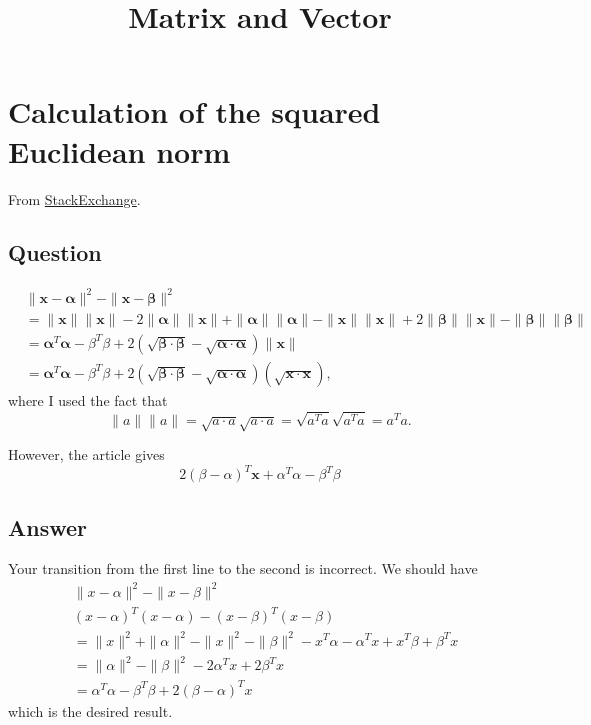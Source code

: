 \documentclass[a4paper,10.5pt]{jsarticle}  %
\begin{document}
\title{Matrix and Vector}
\author{}
\date{}
\maketitle

\setcounter{tocdepth}{1}
\tableofcontents

\section{Calculation of the squared Euclidean norm}
From \href{http://math.stackexchange.com/questions/1865476/calculation-of-the-squared-euclidean-norm/1865487}{StackExchange}.
\subsection{Question}
\begin{align*}
&\|\mathbf{x} - \mathbf{\alpha} \|^2 - \|\mathbf{x} - \mathbf{\beta}\|^2\\
&= \|\mathbf{x}\| \|\mathbf{x}\| - 2 \|\mathbf{\mathbf{\alpha}}\| \|\mathbf{x}\| + \|\mathbf{\alpha}\| \|\mathbf{\mathbf{\alpha}}\|  - \|\mathbf{x}\| \|\mathbf{x}\| +2 \|\mathbf{\beta}\| \|\mathbf{x}\| - \|\mathbf{\beta}\| \|\mathbf{\beta}\|\\
&= \mathbf{\alpha}^T \mathbf{\alpha} - \beta^T \beta + 2(\sqrt{\mathbf{\beta}\cdot\mathbf{\beta}}-\sqrt{\mathbf{\alpha}\cdot\mathbf{\alpha}})\|\mathbf{x}\|\\
&= \mathbf{\alpha}^T \mathbf{\alpha} - \beta^T \beta + 2(\sqrt{\mathbf{\beta}\cdot\mathbf{\beta}}-\sqrt{\mathbf{\alpha}\cdot\mathbf{\alpha}})(\sqrt{\mathbf{x}\cdot\mathbf{x}}),
\end{align*}
where I used the fact that $$\|a\|\|a\| = \sqrt{a\cdot a}\sqrt{a\cdot a} = \sqrt{a^T a}\sqrt{a^T a} = a^Ta.$$

However, the article gives $$2(\beta-\alpha)^T \mathbf{x} + \alpha^T \alpha - \beta^T\beta $$

\subsection{Answer}
Your transition from the first line to the second is incorrect.  We should have
\begin{align*}
  &\|x - \alpha\|^2 - \|x - \beta\|^2\\
  &(x - \alpha)^T(x - \alpha) - (x - \beta)^T(x - \beta)  \\
  &=\|x\|^2 + \|\alpha\|^2 - \|x\|^2 - \|\beta\|^2 - x^T\alpha - \alpha^Tx + x^T\beta + \beta^Tx \\
  &=\|\alpha\|^2 - \|\beta\|^2 - 2\alpha^Tx + 2 \beta^Tx \\
  &=\alpha^T\alpha - \beta^T\beta + 2(\beta - \alpha)^Tx
\end{align*}
which is the desired result.
\end{document}
